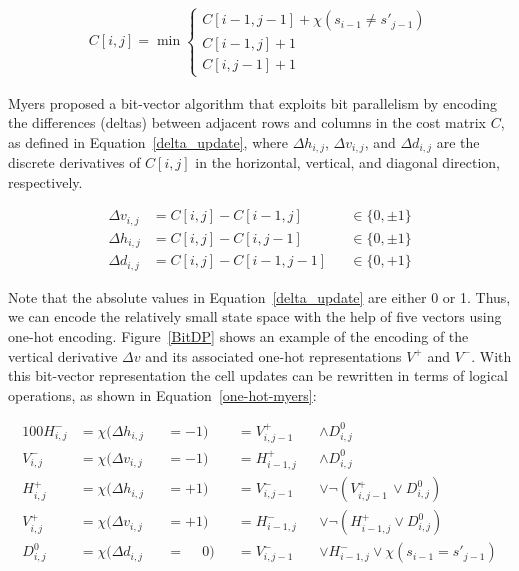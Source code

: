 \begin{align}
  \label{update_scheme} 
  C[i,j]=\min \begin{cases} C[i-1,j-1]+\chi(s_{i-1} \neq s'_{j-1})\\
    C[i-1,j]+1 \\
    C[i,j-1]+1
  \end{cases}
\end{align}

Myers proposed a bit-vector algorithm \cite{myers} that exploits bit
parallelism by encoding the differences (deltas) between adjacent rows
and columns in the cost matrix $C$, as defined in
Equation~\ref{delta_update}, where $\varDelta h_{i,j}$, $\varDelta
v_{i,j}$, and $\varDelta d_{i,j}$ are the discrete derivatives of
$C[i, j]$ in the horizontal, vertical, and diagonal direction,
respectively.

\begin{align} \label{delta_update}
  \varDelta v_{i,j}&=C[i,j]-C[i-1,j]   &&\in \{0, \pm1\} \nonumber\\
  \varDelta h_{i,j}&=C[i,j]-C[i,j-1]   &&\in \{0, \pm1\} \\
  \varDelta d_{i,j}&=C[i,j]-C[i-1,j-1] &&\in \{0, +1\}   \nonumber
\end{align}

Note that the absolute values in Equation~\ref{delta_update} are
either 0 or 1. Thus, we can encode the relatively small state space
with the help of five vectors using one-hot
encoding. Figure~\ref{BitDP} shows an example of the encoding of the
vertical derivative $\varDelta v$ and its associated one-hot
representations $V^+$ and $V^-$.  With this bit-vector representation
the cell updates can be rewritten in terms of logical operations, as
shown in Equation~\ref{one-hot-myers}:

\begin{alignat}{100}
  \label{one-hot-myers}
  H^-_{i, j} &= \chi(\varDelta h_{i, j} &&= -1)            &&= V^+_{i, j-1} &&\land D^0_{i, j} \nonumber\\
  V^-_{i, j} &= \chi(\varDelta v_{i, j} &&= -1)            &&= H^+_{i-1, j} &&\land D^0_{i, j} \nonumber\\
  H^+_{i, j} &= \chi(\varDelta h_{i, j} &&= +1)            &&= V^-_{i, j-1} &&\lor \lnot(V^+_{i, j-1} \,\lor D^0_{i, j}) \\
  V^+_{i, j} &= \chi(\varDelta v_{i, j} &&= +1)            &&= H^-_{i-1, j} &&\lor \lnot(H^+_{i-1, j}   \lor D^0_{i, j}) \nonumber\\
  D^0_{i,j}  &= \chi(\varDelta d_{i, j} &&= \phantom{+}0)  &&= V^-_{i, j-1} &&\lor H^-_{i-1, j} \lor \chi(s_{i-1} = s'_{j-1}) \nonumber 
\end{alignat}

